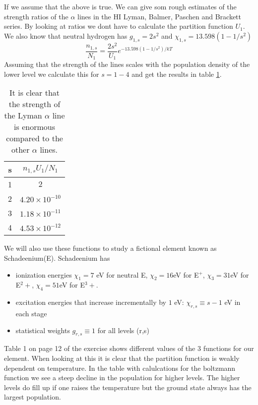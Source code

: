 \documentclass{aa}   %
\begin{document}
If we assume that the above is true. We can give som rough estimates of the strength ratios of the $\alpha$ lines in the HI Lyman, Balmer, Paschen and Brackett series. 
By looking at ratios we dont have to calculate the partition function $U_1$. We also know that neutral hydrogen has $g_{1,s} =2s^2$ and $\chi_{1,s} = 13.598(1-1/s^2)$
\begin{equation}
  \frac{n_{1,s}}{N_1} = \frac{2s^2}{U_1} e^{-13.598(1-1/s^2)/kT} 
\end{equation}
Assuming that the strength of the lines scales with the population density of the lower level we calculate this for $s = 1 - 4$ and get the results in table \ref{alpha_ratio}.
\begin{table}
\begin{center}
 \begin{tabular}{|c|c|}
 \hline
 s & $n_{1,s}U_1/N_1 $\\
 \hline
 1 & $2$\\
 \hline
 2 & $4.20\times10^{-10}$\\
 \hline
 3 & $1.18\times10^{-11}$\\
 \hline
 4 & $4.53\times10^{-12}$\\
 \hline
 \end{tabular}
 \caption{It is clear that the strength of the Lyman $\alpha$ line is enormous compared to the other $\alpha$ lines.}
\label{alpha_ratio}
 \end{center}
 \end{table}
We will also use these functions to study a fictional element known as Schadeenium(E).
Schadeenium has 
\begin{itemize}
\item
ionization energies $\chi_1 = 7$ eV for neutral E, $\chi_2 = 16$eV for E$^+$, $\chi_3 = 31$eV for E$^2+$, $\chi_4 = 51$eV for E$^3+$. 
\item
excitation energies that increase incrementally by $1$ eV: $\chi_{r,s} \equiv s -1$ eV in each stage
\item
statistical weights $g_{r,s} \equiv 1$ for all levels (r,s)
\end{itemize}
Table 1 on page 12 of the exercise shows different values of the 3 functions for our element.
When looking at this it is clear that the partition function is weakly dependent on temperature.
In the table with calulcations for the boltzmann function we see a steep decline in the population for higher levels.
The higher levels do fill up if one raises the temperature but the ground state always has the largest population.
\end{document}
